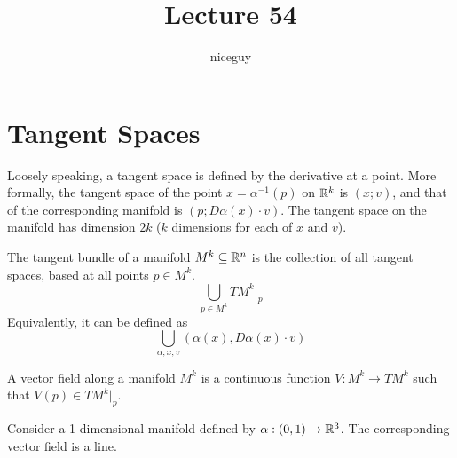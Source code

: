 \documentclass[12pt]{article}
\title{Lecture 54}
\author{niceguy}
\begin{document}
\maketitle

\section{Tangent Spaces}

Loosely speaking, a tangent space is defined by the derivative at a point. More formally, the tangent space of the point $x = \alpha^{-1}(p)$ on $\mathbb{R}^k$ is $(x;v)$, and that of the corresponding manifold is $(p;D\alpha(x) \cdot v)$. The tangent space on the manifold has dimension $2k$ ($k$ dimensions for each of $x$ and $v$).

\begin{defn}
    The tangent bundle of a manifold $M^k \subseteq \mathbb{R}^n$ is the collection of all tangent spaces, based at all points $p \in M^k$.
    $$\bigcup_{p\in M^k} TM^k|_p$$
    Equivalently, it can be defined as
    $$\bigcup_{\alpha,x,v}(\alpha(x),D\alpha(x)\cdot v)$$
\end{defn}

\begin{defn}
    A vector field along a manifold $M^k$ is a continuous function $V:M^k \rightarrow TM^k$ such that $V(p) \in TM^k|_p$.
\end{defn}

\begin{ex}
    Consider a 1-dimensional manifold defined by $\alpha:(0,1)\rightarrow\mathbb{R}^3$. The corresponding vector field is a line.
\end{ex}
\end{document}
